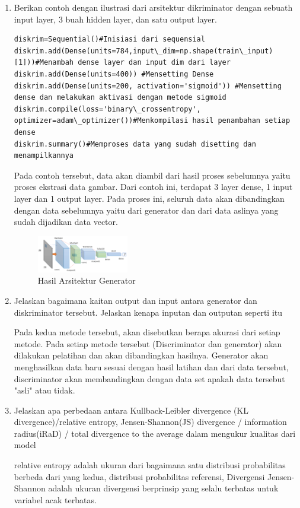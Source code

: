 \begin{enumerate}
            \item Berikan contoh dengan ilustrasi dari arsitektur dikriminator dengan sebuath input layer, 3 buah hidden layer, dan satu output layer.
\begin{verbatim}
diskrim=Sequential()#Inisiasi dari sequensial
diskrim.add(Dense(units=784,input\_dim=np.shape(train\_input)[1]))#Menambah dense layer dan input dim dari layer
diskrim.add(Dense(units=400)) #Mensetting Dense
diskrim.add(Dense(units=200, activation='sigmoid')) #Mensetting dense dan melakukan aktivasi dengan metode sigmoid
diskrim.compile(loss='binary\_crossentropy', optimizer=adam\_optimizer())#Menkompilasi hasil penambahan setiap dense
diskrim.summary()#Memproses data yang sudah disetting dan menampilkannya
\end{verbatim}
            \par Pada contoh tersebut, data akan diambil dari hasil proses sebelumnya yaitu proses ekstrasi data gambar. Dari contoh ini, terdapat 3 layer dense, 1 input layer dan 1 output layer. Pada proses ini, seluruh data akan dibandingkan dengan data sebelumnya yaitu dari generator dan dari data aslinya yang sudah dijadikan data vector. 
            \begin{figure}[H]
                \includegraphics[width=4cm]{figures/1174039/chapter8/teori10.PNG}
                \centering
                  \caption{Hasil Arsitektur Generator}
            \end{figure}
            
            \item Jelaskan bagaimana kaitan output dan input antara generator dan diskriminator tersebut. Jelaskan kenapa inputan dan outputan seperti itu
            \par Pada kedua metode tersebut, akan disebutkan berapa akurasi dari setiap metode. Pada setiap metode tersebut (Discriminator dan generator) akan dilakukan pelatihan dan akan dibandingkan hasilnya. Generator akan menghasilkan data baru sesuai dengan hasil latihan dan dari data tersebut, discriminator akan membandingkan dengan data set apakah data tersebut "asli" atau tidak.
            
            \item Jelaskan apa perbedaan antara Kullback-Leibler divergence (KL divergence)/relative entropy, Jensen-Shannon(JS) divergence / information radius(iRaD) / total divergence to the average dalam mengukur kualitas dari model
            \par relative entropy adalah ukuran dari bagaimana satu distribusi probabilitas berbeda dari yang kedua, distribusi probabilitas referensi, Divergensi Jensen-Shannon adalah ukuran divergensi berprinsip yang selalu terbatas untuk variabel acak terbatas.


\end{enumerate}
